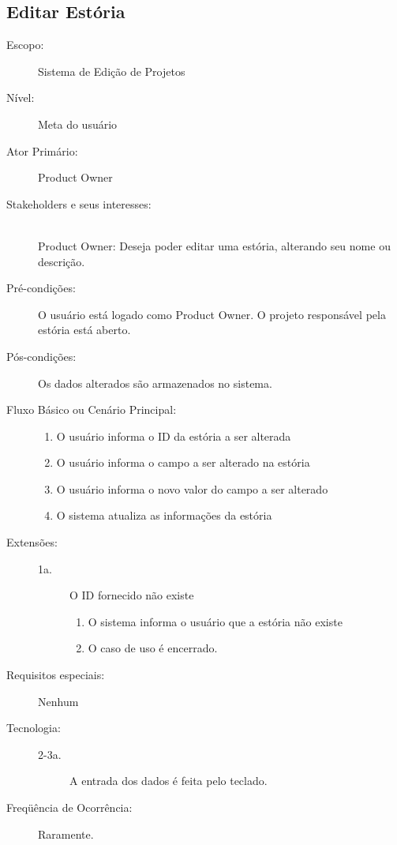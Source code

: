 \documentclass[brazil,times]{abnt}
\begin{document}
\subsection{Editar Estória}
\begin{description}
\item[Escopo:] Sistema de Edição de Projetos
\item[Nível:] Meta do usuário
\item[Ator Primário:] Product Owner

\item[Stakeholders e seus interesses:] \hfill \\ 
Product Owner: Deseja poder editar uma estória, alterando seu nome ou descrição.

\item[Pré-condições:] O usuário está logado como Product Owner. O projeto
responsável pela estória está aberto.

\item[Pós-condições:] Os dados alterados são armazenados no sistema.

\item[Fluxo Básico ou Cenário Principal:] \hfill
\begin{enumerate}
  \item O usuário informa o ID da estória a ser alterada
  \item O usuário informa o campo a ser alterado na estória
  \item O usuário informa o novo valor do campo a ser alterado
  \item O sistema atualiza as informações da estória
\end{enumerate}

\item[Extensões:] \hfill
\begin{description}
	\item[1a.] O ID fornecido não existe
		\begin{enumerate}
 			\item O sistema informa o usuário que a estória não existe
 			\item O caso de uso é encerrado.
		\end{enumerate}
\end{description}
\item[Requisitos especiais:] Nenhum

\item[Tecnologia:] \hfill
\begin{description} 
	\item[2-3a.] A entrada dos dados é feita pelo teclado.
\end{description}
\item[Freqüência de Ocorrência:] Raramente.

\end{description}
\end{document}
